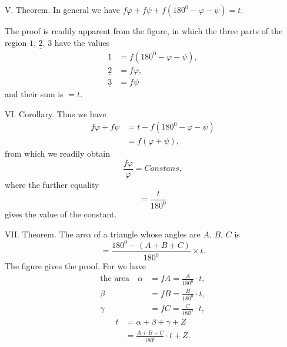 %
V. Theorem. In general we have $f\varphi+f\psi+f(180^{0}-\varphi-\psi)=t$.

The proof is readily apparent from the figure, in which the three parts of the region $\underline{1,\,2,\,3}$ have the values
\[
\begin{aligned}
\underline{1}&=f(180^{0}-\varphi-\psi),\\
\underline{2}&=f\varphi,\\
\underline{3}&=f\psi
\end{aligned}
\]
and their sum is $=t$.
\begin{center}\end{center}

VI. Corollary. Thus we have
\[
\begin{aligned}
f\varphi+f\psi&=t-f(180^{0}-\varphi-\psi)\\
&=f(\varphi+\psi),
\end{aligned}
\]
from which we readily obtain
\[
\frac{f\varphi}{\varphi}=\mathit{Constans},
\]
where the further equality
\[
=\frac{t}{180^{0}}
\]
gives the value of the constant.

VII. Theorem. The area of a triangle whose angles are $A$, $B$, $C$ is
\[
=\frac{180^{0}-(A+B+C)}{180^{0}}\times t.
\]
The figure gives the proof. For we have
\[
\begin{aligned}
\text{the area}\quad\alpha&=fA=\frac{A}{180^{0}}\cdot t,\\
\beta&=fB=\frac{B}{180^{0}}\cdot t,\\
\gamma&=fC=\frac{C}{180^{0}}\cdot t,
\end{aligned}
\]
\[
\begin{aligned}
t&=\alpha+\beta+\gamma+Z\\
&=\frac{A+B+C}{180^{0}}\cdot t+Z.
\end{aligned}
\]
\begin{center}\end{center}

